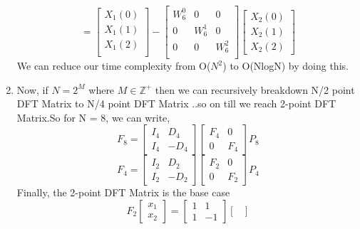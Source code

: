 \documentclass[journal,12pt,twocolumn]{IEEEtran}
\renewcommand\thesection{\arabic{section}}
\begin{document}
\begin{enumerate}[label=\thesection.\arabic*.,ref=\thesection.\theenumi]
\begin{equation}
=
\begin{bmatrix}
X_{1}(0) \\  
X_{1}(1)\\ 
X_{1}(2)\\
\end{bmatrix}
-
\begin{bmatrix}
W^{0}_{6} & 0 & 0\\
0 & W^{1}_{6} & 0\\
0 & 0 & W^{2}_{6}\\
\end{bmatrix}
\begin{bmatrix}
X_{2}(0) \\ 
X_{2}(1) \\ 
X_{2}(2)
\end{bmatrix} 
\end{equation}
We can reduce our time complexity from O($N^{2}$) to O(NlogN) by doing this. 
\item Now, if $N = 2^{M}$ where $M \in \mathbb{Z^{+}}$  then we can recursively breakdown N/2 point DFT Matrix to N/4 point DFT Matrix ..so on till we reach 2-point DFT Matrix.So for N = 8, we can write,
\begin{equation}
F_{8}=
\begin{bmatrix}
I_{4} & D_{4} \\
I_{4} & -D_{4}
\end{bmatrix}
\begin{bmatrix}
F_{4} & 0 \\
0 & F_{4}
\end{bmatrix}
P_{8}
\end{equation}
\begin{equation}
F_{4}=
\begin{bmatrix}
I_{2} & D_{2} \\
I_{2} & -D_{2}
\end{bmatrix}
\begin{bmatrix}
F_{2} & 0 \\
0 & F_{2}
\end{bmatrix}
P_{4}
\end{equation}
Finally, the 2-point DFT Matrix is the base case 
\begin{equation}
F_{2}
\begin{bmatrix}
x_{1} \\
x_{2}
\end{bmatrix}
=
\begin{bmatrix}
1 & 1 \\
1 & -1
\end{bmatrix}
\begin{bmatrix}

\end{bmatrix}
\end{equation}
\end{enumerate}
\end{document}
